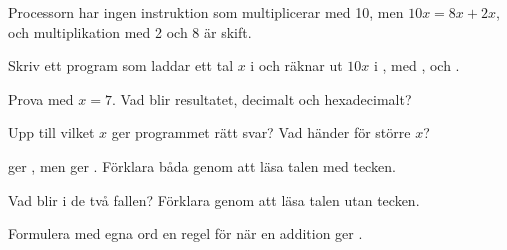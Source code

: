 \label{c8:ex:11}
Processorn har ingen instruktion som multiplicerar med 10, men $10x = 8x + 2x$, och multiplikation
med 2 och 8 är skift.
\begin{parts}
  \item Skriv ett program som laddar ett tal $x$ i  och räknar ut $10x$ i , med
    ,  och .
  \item Prova med $x = 7$. Vad blir resultatet, decimalt och hexadecimalt?
  \item Upp till vilket $x$ ger programmet rätt svar? Vad händer för större $x$?
\end{parts}

\label{c8:ex:12}
\begin{parts}
  \item {} ger , men  ger . Förklara båda
    genom att läsa talen med tecken.
  \item Vad blir  i de två fallen? Förklara genom att läsa talen utan tecken.
  \item Formulera med egna ord en regel för när en addition ger .
\end{parts}
